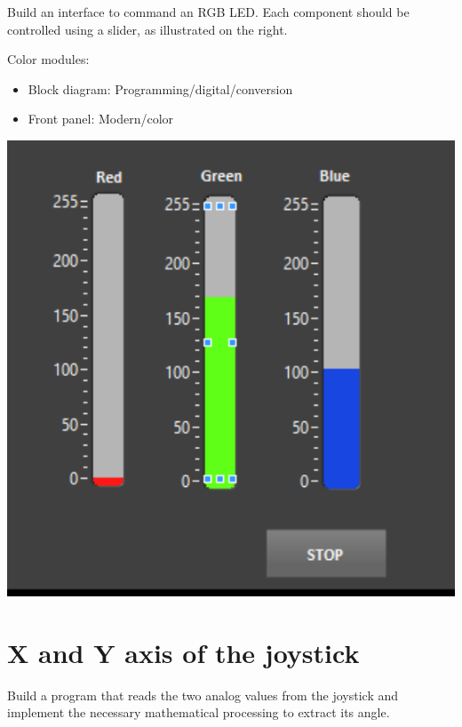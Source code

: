 \documentclass{labo}
\begin{document}
\begin{minipage}{.45\textwidth}
Build an interface to command an RGB LED.
Each component should be controlled using a slider, as illustrated on the right.

\begin{leftbar}
Color modules:
\begin{itemize}
  \item Block diagram: Programming/digital/conversion
  \item Front panel: Modern/color
\end{itemize}
\end{leftbar}
\end{minipage}
\hfill
\begin{minipage}{.5\textwidth}
\includegraphics[width=\textwidth]{front-panel-rgb.png}
\end{minipage}



\section{X and Y axis of the joystick}\label{sec:joystick}
Build a program that reads the two analog values from the joystick and implement the necessary mathematical processing to extract its angle.
\end{document}
